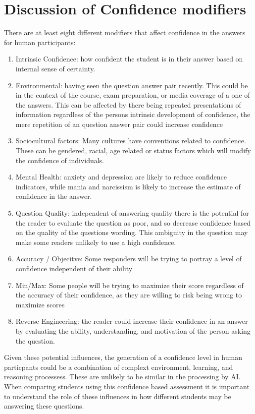 \documentclass[sigconf]{acmart}
\begin{document}
\section{Discussion of Confidence modifiers}
There are at least eight different modifiers that affect confidence in the answers for human participants:
\begin{enumerate}
    \item Intrinsic Confidence: how confident the student is in their answer based on internal sense of certainty.
    \item Environmental: having seen the question answer pair recently.  This could be in the context of the course, exam preparation, or media coverage of a one of the answers.  This can be affected by there being repeated presentations of information regardless of the persons intrinsic development of confidence, the mere repetition of an question answer pair could increase confidence
    \item Sociocultural factors: Many cultures have conventions related to confidence.  These can be gendered, racial, age related or status factors which will modify the confidence of individuals.
    \item Mental Health: anxiety and depression are likely to reduce confidence indicators, while mania and narcissism is likely to increase the estimate of confidence in the answer.
    \item Question Quality: independent of answering quality there is the potential for the reader to evaluate the question as poor, and so decrease confidence based on the quality of the questions wording.  This ambiguity in the question may make some readers unlikely to use a high confidence.
    \item Accuracy / Objecitve: Some responders will be trying to portray a level of confidence independent of their ability 
    \item Min/Max: Some people will be trying to maximize their score regardless of the accuracy of their confidence, as they are willing to risk being wrong to maximize scores
    \item Reverse Engineering: the reader could increase their confidence in an answer by evaluating the ability, understanding, and motivation of the person asking the question. 
\end{enumerate}
Given these potential influences, the generation of a confidence level in human particpants could be a combination of complext environment, learning, and reasoning processess.  These are unlikely to be similar in the processing by AI.  When comparing students using this confidence based assessment it is important to understand the role of these influences in how different students may be answering these questions.
\end{document}
